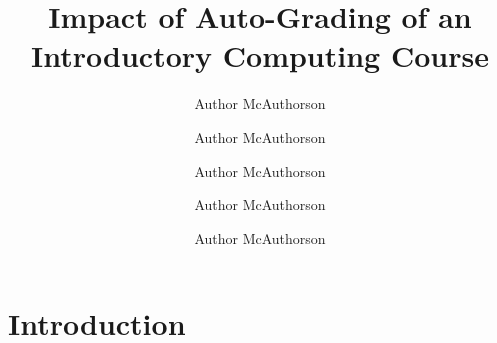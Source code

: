 \documentclass[11pt]{amsart}
\title{Impact of Auto-Grading of an Introductory Computing Course}
\author{Author McAuthorson \and Author McAuthorson \and Author McAuthorson \and Author McAuthorson \and Author McAuthorson}
\begin{document}
\maketitle

\section{Introduction}


\end{document}
